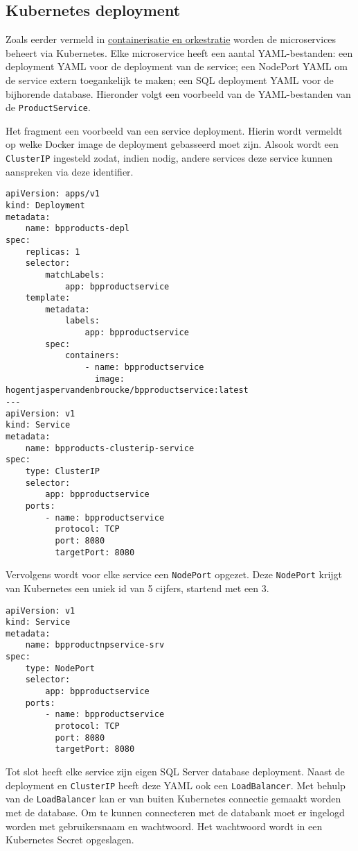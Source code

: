 \subsection{Kubernetes deployment}

Zoals eerder vermeld in \hyperref[containerisatie_orkestratie]{containerisatie en orkestratie} worden de microservices beheert via Kubernetes. Elke microservice heeft een aantal YAML-bestanden: een deployment YAML voor de deployment van de service; een NodePort YAML om de service extern toegankelijk te maken; een SQL deployment YAML voor de bijhorende database. Hieronder volgt een voorbeeld van de YAML-bestanden van de \texttt{ProductService}.\newline

Het fragment een voorbeeld van een service deployment. Hierin wordt vermeldt op welke Docker image de deployment gebasseerd moet zijn. Alsook wordt een \texttt{ClusterIP} ingesteld zodat, indien nodig, andere services deze service kunnen aanspreken via deze identifier.\medskip

\begin{lstlisting}[style=mystyleA, caption=bpproducts-depl.yaml, label=lst:BPProductsDepl]
apiVersion: apps/v1
kind: Deployment
metadata:
	name: bpproducts-depl
spec:
	replicas: 1
	selector:
		matchLabels:
			app: bpproductservice
	template:
		metadata:
			labels:
				app: bpproductservice
		spec:
			containers:
				- name: bpproductservice
  		  		  image: hogentjaspervandenbroucke/bpproductservice:latest
---
apiVersion: v1
kind: Service
metadata:
	name: bpproducts-clusterip-service
spec:
	type: ClusterIP
	selector:
		app: bpproductservice
	ports:
		- name: bpproductservice
  		  protocol: TCP
  		  port: 8080
  		  targetPort: 8080
\end{lstlisting}

Vervolgens wordt voor elke service een \texttt{NodePort} opgezet. Deze \texttt{NodePort} krijgt van Kubernetes een uniek id van 5 cijfers, startend met een 3.\medskip

\begin{lstlisting}[style=mystyleA, caption=bpproducts-np-srv.yaml, label=lst:BPProductsNP]
apiVersion: v1
kind: Service
metadata:
	name: bpproductnpservice-srv
spec:
	type: NodePort
	selector:
		app: bpproductservice
	ports:
		- name: bpproductservice
		  protocol: TCP
		  port: 8080
		  targetPort: 8080
\end{lstlisting}

Tot slot heeft elke service zijn eigen SQL Server database deployment. Naast de deployment en \texttt{ClusterIP} heeft deze YAML ook een \texttt{LoadBalancer}. Met behulp van de \texttt{LoadBalancer} kan er van buiten Kubernetes connectie gemaakt worden met de database. Om te kunnen connecteren met de databank moet er ingelogd worden met gebruikersnaam en wachtwoord. Het wachtwoord wordt in een Kubernetes Secret opgeslagen.\medskip

